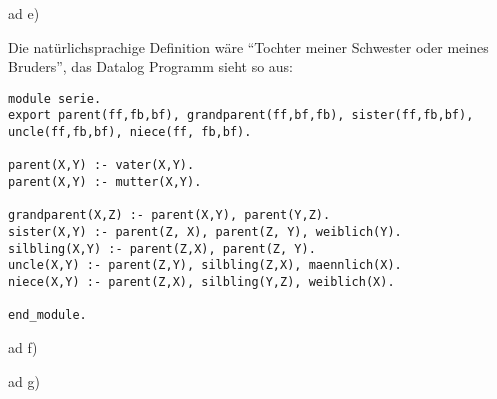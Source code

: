 \documentclass[12pt,a4paper]{amsart}
\begin{document}
\medskip

ad e)

Die natürlichsprachige Definition wäre ``Tochter meiner Schwester oder meines Bruders'', das Datalog Programm sieht so aus:

\begin{lstlisting}
module serie.
export parent(ff,fb,bf), grandparent(ff,bf,fb), sister(ff,fb,bf), uncle(ff,fb,bf), niece(ff, fb,bf).

parent(X,Y) :- vater(X,Y).
parent(X,Y) :- mutter(X,Y).

grandparent(X,Z) :- parent(X,Y), parent(Y,Z).
sister(X,Y) :- parent(Z, X), parent(Z, Y), weiblich(Y).
silbling(X,Y) :- parent(Z,X), parent(Z, Y).
uncle(X,Y) :- parent(Z,Y), silbling(Z,X), maennlich(X).
niece(X,Y) :- parent(Z,X), silbling(Y,Z), weiblich(X).

end_module.
\end{lstlisting}

\medskip

ad f)

\medskip

ad g)

\medskip
\end{document}
